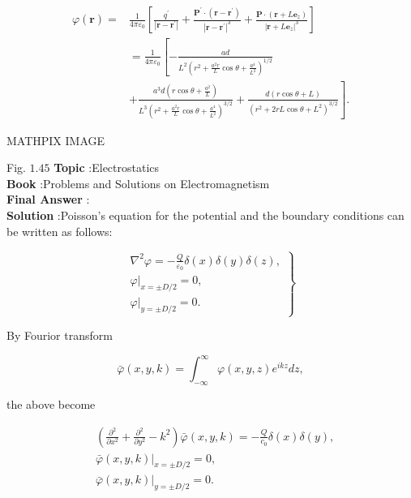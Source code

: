 \documentclass[10pt]{article}
\begin{document}
$$
\begin{aligned}
\varphi(\mathbf{r})=& \frac{1}{4 \pi \varepsilon_{0}}\left[\frac{q^{\prime}}{\left|\mathbf{r}-\mathbf{r}^{\prime}\right|}+\frac{\mathbf{P}^{\prime} \cdot\left(\mathbf{r}-\mathbf{r}^{\prime}\right)}{\left|\mathbf{r}-\mathbf{r}^{\prime}\right|^{3}}+\frac{\mathbf{P} \cdot\left(\mathbf{r}+L \mathbf{e}_{z}\right)}{\left|\mathbf{r}+L \mathbf{e}_{z}\right|^{3}}\right] \\
&=\frac{1}{4 \pi \varepsilon_{0}}\left[-\frac{a d}{L^{2}\left(r^{2}+\frac{a^{2} r}{L} \cos \theta+\frac{a^{4}}{L^{2}}\right)^{1 / 2}}\right.\\
&\left.+\frac{a^{3} d\left(r \cos \theta+\frac{a^{2}}{L}\right)}{L^{3}\left(r^{2}+\frac{a^{2} r}{L} \cos \theta+\frac{a^{4}}{L^{2}}\right)^{3 / 2}}+\frac{d(r \cos \theta+L)}{\left(r^{2}+2 r L \cos \theta+L^{2}\right)^{3 / 2}}\right] .
\end{aligned}
$$

MATHPIX IMAGE

Fig. $1.45$
\textbf{Topic} :Electrostatics\\
\textbf{Book} :Problems and Solutions on Electromagnetism\\
\textbf{Final Answer} :\\


\textbf{Solution} :Poisson's equation for the potential and the boundary conditions can be written as follows:

$$
\left.\begin{array}{l}
\nabla^{2} \varphi=-\frac{Q}{\varepsilon_{0}} \delta(x) \delta(y) \delta(z), \\
\left.\varphi\right|_{x=\pm D / 2}=0, \\
\left.\varphi\right|_{y=\pm D / 2}=0 .
\end{array}\right\}
$$

By Fourior transform

$$
\bar{\varphi}(x, y, k)=\int_{-\infty}^{\infty} \varphi(x, y, z) e^{i k z} d z,
$$

the above become

$$
\begin{aligned}
&\left(\frac{\partial^{2}}{\partial x^{2}}+\frac{\partial^{2}}{\partial y^{2}}-k^{2}\right) \bar{\varphi}(x, y, k)=-\frac{Q}{c_{0}} \delta(x) \delta(y), \\
&\left.\bar{\varphi}(x, y, k)\right|_{x=\pm D / 2}=0, \\
&\left.\bar{\varphi}(x, y, k)\right|_{y=\pm D / 2}=0 .
\end{aligned}
$$
\end{document}
